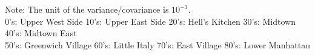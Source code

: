 \begin{landscape}
\begin{table}[h]
{\begin{center}
{\begin{tabular}{l*{19}{c}}
\hline\hline

\end{tabular}
}

\end{center}
\footnotesize  Note: The unit of the variance/covariance is $10^{-3}$. \\
\footnotesize  \hspace{0.8cm} 0's: Upper West Side \hspace{0.2cm} 10's: Upper East Side \hspace{0.2cm} 20's: Hell's Kitchen \hspace{0.2cm} 30's: Midtown \hspace{0.2cm} 40's: Midtown East\\\hspace{0.8cm} 50's: Greenwich Village \hspace{0.2cm} 60's: Little Italy \hspace{0.2cm} 70's: East Village \hspace{0.2cm} 80's: Lower Manhattan
}

\end{table}
\end{landscape}

